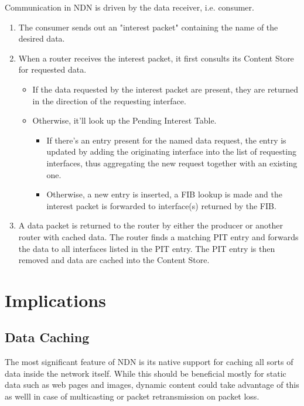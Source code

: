             Communication in NDN is driven by the data receiver, i.e. consumer.

            \begin{enumerate}
                \item The consumer sends out an "interest packet" containing the name of the desired data.
                \item When a router receives the interest packet, it first consults its Content Store for requested data.
                    \begin{itemize}
                        \item If the data requested by the interest packet are present, they are returned in the direction of the requesting interface.
                        \item Otherwise, it'll look up the Pending Interest Table.
                        \begin{itemize}
                            \item If there's an entry present for the named data request, the entry is updated by adding the originating interface into the list of requesting interfaces, thus aggregating the new request together with an existing one.
                            \item Otherwise, a new entry is inserted, a FIB lookup is made and the interest packet is forwarded to interface(s) returned by the FIB.
                        \end{itemize}
                    \end{itemize}
                \item A data packet is returned to the router by either the producer or another router with cached data. The router finds a matching PIT entry and forwards the data to all interfaces listed in the PIT entry. The PIT entry is then removed and data are cached into the Content Store.
            \end{enumerate}

    \section{Implications}
        \subsection{Data Caching}
            The most significant feature of NDN is its native support for caching all sorts of data inside the network itself. While this should be beneficial mostly for static data such as web pages and images, dynamic content could take advantage of this as welll in case of multicasting or packet retransmission on packet loss.

